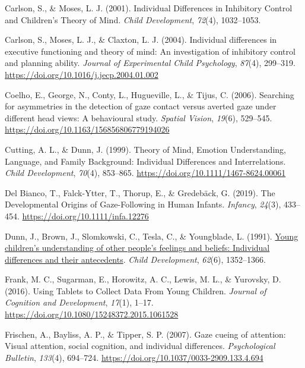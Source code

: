 \documentclass[
  man,floatsintext]{apa6}
\newlength{\cslhangindent}
\newlength{\cslentryspacingunit} %
\newenvironment{CSLReferences}[2] %
 {%
  \setlength{\parindent}{0pt}
  \ifodd #1
  \let\oldpar\par
  \def\par{\hangindent=\cslhangindent\oldpar}
  \fi
  \setlength{\parskip}{#2\cslentryspacingunit}
 }%
 {}
\begin{document}
\begin{CSLReferences}{1}{0}
\leavevmode{}%
Carlson, S., \& Moses, L. J. (2001). Individual {Differences} in {Inhibitory Control} and {Children}'s {Theory} of {Mind}. \emph{Child Development}, \emph{72}(4), 1032--1053.

\leavevmode{}%
Carlson, S., Moses, L. J., \& Claxton, L. J. (2004). Individual differences in executive functioning and theory of mind: {An} investigation of inhibitory control and planning ability. \emph{Journal of Experimental Child Psychology}, \emph{87}(4), 299--319. \url{https://doi.org/10.1016/j.jecp.2004.01.002}

\leavevmode{}%
Coelho, E., George, N., Conty, L., Hugueville, L., \& Tijus, C. (2006). Searching for asymmetries in the detection of gaze contact versus averted gaze under different head views: A behavioural study. \emph{Spatial Vision}, \emph{19}(6), 529--545. \url{https://doi.org/10.1163/156856806779194026}

\leavevmode{}%
Cutting, A. L., \& Dunn, J. (1999). Theory of {Mind}, {Emotion Understanding}, {Language}, and {Family Background}: {Individual Differences} and {Interrelations}. \emph{Child Development}, \emph{70}(4), 853--865. \url{https://doi.org/10.1111/1467-8624.00061}

\leavevmode{}%
Del Bianco, T., Falck-Ytter, T., Thorup, E., \& Gredebäck, G. (2019). The {Developmental Origins} of {Gaze-Following} in {Human Infants}. \emph{Infancy}, \emph{24}(3), 433--454. \url{https://doi.org/10.1111/infa.12276}

\leavevmode{}%
Dunn, J., Brown, J., Slomkowski, C., Tesla, C., \& Youngblade, L. (1991). \href{https://www.ncbi.nlm.nih.gov/pubmed/1786720}{Young children's understanding of other people's feelings and beliefs: Individual differences and their antecedents}. \emph{Child Development}, \emph{62}(6), 1352--1366.

\leavevmode{}%
Frank, M. C., Sugarman, E., Horowitz, A. C., Lewis, M. L., \& Yurovsky, D. (2016). Using {Tablets} to {Collect Data From Young Children}. \emph{Journal of Cognition and Development}, \emph{17}(1), 1--17. \url{https://doi.org/10.1080/15248372.2015.1061528}

\leavevmode{}%
Frischen, A., Bayliss, A. P., \& Tipper, S. P. (2007). Gaze cueing of attention: {Visual} attention, social cognition, and individual differences. \emph{Psychological Bulletin}, \emph{133}(4), 694--724. \url{https://doi.org/10.1037/0033-2909.133.4.694}


\end{CSLReferences}
\end{document}
